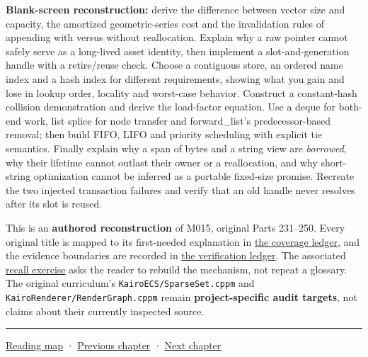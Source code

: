 \textbf{Blank-screen reconstruction:} derive the difference between vector size and capacity, the amortized geometric-series cost and the invalidation rules of appending with versus without reallocation. Explain why a raw pointer cannot safely serve as a long-lived asset identity, then implement a slot-and-generation handle with a retire/reuse check. Choose a contiguous store, an ordered name index and a hash index for different requirements, showing what you gain and lose in lookup order, locality and worst-case behavior. Construct a constant-hash collision demonstration and derive the load-factor equation. Use a deque for both-end work, list splice for node transfer and forward\_list's predecessor-based removal; then build FIFO, LIFO and priority scheduling with explicit tie semantics. Finally explain why a span of bytes and a string view are \emph{borrowed}, why their lifetime cannot outlast their owner or a reallocation, and why short-string optimization cannot be inferred as a portable fixed-size promise. Recreate the two injected transaction failures and verify that an old handle never resolves after its slot is reused.

This is an \textbf{authored reconstruction} of M015, original Parts 231--250. Every original title is mapped to its first-needed explanation in \hyperref[appendix-fd090d982a15-m015-parts-231250-growing-the-asset-registry-without-losing-identities]{the coverage ledger}, and the evidence boundaries are recorded in \hyperref[appendix-a103e7846d21-phase-5-additive-reconstruction-m015-parts-231250]{the verification ledger}. The associated \hyperref[appendix-960160274237-a-growing-asset-store-must-preserve-its-promises-m015-retrieval]{recall exercise} asks the reader to rebuild the mechanism, not repeat a glossary. The original curriculum's \texttt{KairoECS/SparseSet.cppm} and \texttt{KairoRenderer/RenderGraph.cppm} remain \textbf{project-specific audit targets}, not claims about their currently inspected source.

\begin{center}\rule{0.5\linewidth}{0.5pt}\end{center}

\hyperref[volume-reading-map]{Reading map} · \hyperref[05-engine-i-ch004-resource-ownership-failure-paths-and-review-practice]{Previous chapter} · \hyperref[05-engine-i-ch006-queries-lazy-ranges-allocators-and-module-boundaries]{Next chapter}
